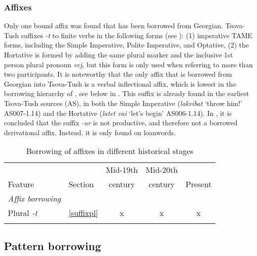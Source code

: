 \subsubsection{Affixes} \label{conclaffix}
Only one bound affix was found that has been borrowed from Georgian. Tsova-Tush suffixes \textit{-t} to finite verbs in the following forms (see ): (1) imperative TAME forms, including the Simple Imperative, Polite Imperative, and Optative, (2) the Hortative is formed by adding the same plural marker and the inclusive 1st person plural pronoun \textit{vej}, but this form is only used when referring to more than two participants.
It is noteworthy that the only affix that is borrowed from Georgian into Tsova-Tush is a verbal inflectional affix, which is lowest in the borrowing hierarchy of \textcite[208]{matras2011universals}, see below in . This suffix is already found in the earliest Tsova-Tush sources (AS), in both the Simple Imperative (\textit{lakvibat} `throw him!' AS007-1.14) and the Hortative (\textit{latet vai} `let's begin' AS006-1.14).
In , it is concluded that the suffix \textit{-ur} is not productive, and therefore not a borrowed derivational affix. Instead, it is only found on loanwords.

\begin{table}
	\begin{tabular}{llccc}
    \lsptoprule
		&  & {Mid-19th} & {Mid-20th} &  \\
		Feature & {Section} & {century} & {century} & {Present}  \\
		\midrule
		\emph{Affix borrowing}&  & & & \\
		Plural \textit{-t} & \ref{suffixpl} & x & x & x \\
		\lspbottomrule
	\end{tabular}
	\caption{Borrowing of affixes in different historical stages}
	\label{concl-table4}
\end{table}	


\subsection{Pattern borrowing} \label{conclpattern}
